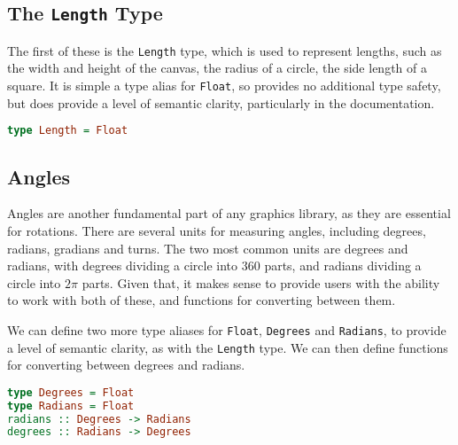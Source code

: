 \documentclass[../main.tex]{subfiles}
\begin{document}
        \subsection{The \texttt{Length}
            Type} The first of these is the \texttt{Length} type, which is used to
                represent lengths, such as the width and height of the canvas, the radius of a
                circle, the side length of a square.
            It is simple a type alias for \texttt{Float}, so provides no additional type
                safety, but does provide a level of semantic clarity, particularly in the
                documentation.
            \begin{lstlisting}[language={Haskell}, label={lst:length}, caption={The \texttt{Length} type definition.}]
type Length = Float\end{lstlisting}

        \subsection{Angles}
            Angles are another fundamental part of any graphics library, as they are
                essential for rotations.
            There are several units for measuring angles, including degrees, radians,
                gradians and turns.
            The two most common units are degrees and radians, with degrees dividing a
                circle into 360 parts, and radians dividing a circle into $2\pi$ parts.
            Given that, it makes sense to provide users with the ability to work with both
                of these, and functions for converting between them.

            We can define two more type aliases for \texttt{Float}, \texttt{Degrees} and
                \texttt{Radians}, to provide a level of semantic clarity, as with the
                \texttt{Length} type.
            We can then define functions for converting between degrees and radians.

            \begin{lstlisting}[language={Haskell}, label={lst:angleFns}, caption={The angle functions.}]  
type Degrees = Float
type Radians = Float                
radians :: Degrees -> Radians
degrees :: Radians -> Degrees\end{lstlisting}
\end{document}
